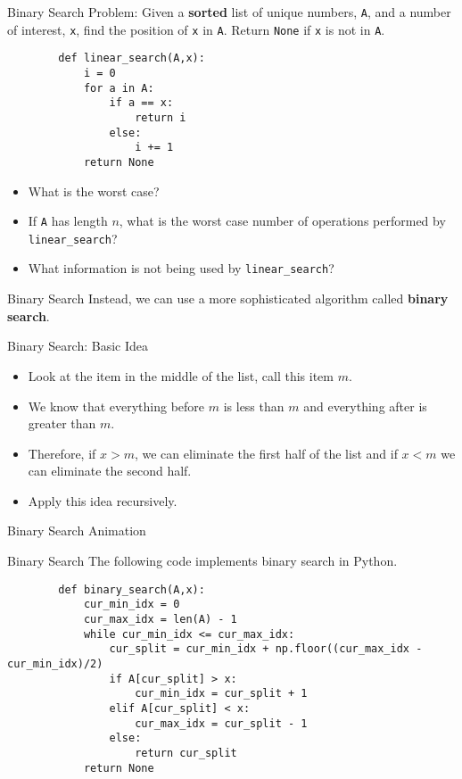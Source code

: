 \documentclass[serif,xcolor=pdftex,dvipsnames,table,hyperref={bookmarks=false,breaklinks}]{beamer}
\begin{document}
\begin{frame}[t,fragile]{Binary Search}
	Problem: Given a \textbf{sorted} list of unique numbers, \verb|A|, and a number of interest, \verb|x|, find the position of \verb|x| in \verb|A|. Return \verb|None| if \verb|x| is not in \verb|A|.
	
	\pause
	\begin{lstlisting}
		def linear_search(A,x):
		    i = 0
		    for a in A:
		        if a == x:
		            return i
		        else:
		            i += 1
		    return None
	\end{lstlisting}
	
	\pause
	\begin{itemize}[<+->]
		\item What is the worst case?
		\item If \verb|A| has length $n$, what is the worst case number of operations performed by \verb|linear_search|?
		\item What information is not being used by \verb|linear_search|?
	\end{itemize}
	
\end{frame}

\begin{frame}[t]{Binary Search}
	Instead, we can use a more sophisticated algorithm called \textbf{binary search}.
	
	\pause
	\begin{block}{Binary Search: Basic Idea}
		\begin{itemize}[<+->]
			\item Look at the item in the middle of the list, call this item $m$. 
			\item We know that everything before $m$ is less than $m$ and everything after is greater than $m$.
			\item Therefore, if $x > m$, we can eliminate the first half of the list and if $x < m$ we can eliminate the second half.
			\item Apply this idea recursively.
		\end{itemize}
	\end{block}
	
\end{frame}

\begin{frame}[t]{Binary Search}
	\centering
	\Huge{Animation}
\end{frame}

\begin{frame}[t,fragile]{Binary Search}
	The following code implements binary search in Python.
	
	\pause
	\begin{lstlisting}
		def binary_search(A,x):
		    cur_min_idx = 0
		    cur_max_idx = len(A) - 1
		    while cur_min_idx <= cur_max_idx:
		        cur_split = cur_min_idx + np.floor((cur_max_idx - cur_min_idx)/2)
		        if A[cur_split] > x:
		            cur_min_idx = cur_split + 1
		        elif A[cur_split] < x:
		            cur_max_idx = cur_split - 1
		        else:
		            return cur_split
		    return None
	\end{lstlisting}
\end{frame}
	
\end{document}
